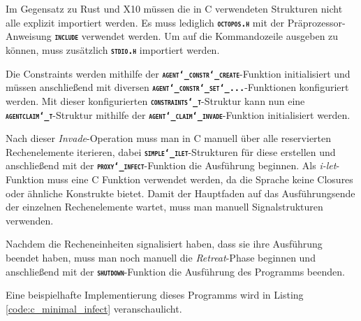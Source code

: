 Im Gegensatz zu Rust und X10 müssen die in C verwendeten Strukturen nicht alle explizit importiert werden.
Es muss lediglich \texttt{\textsc{\textbf{octopos.h}}} mit der Präprozessor-Anweisung
\texttt{\textsc{\textbf{include}}} verwendet werden.
Um auf die Kommandozeile ausgeben zu können, muss zusätzlich \texttt{\textsc{\textbf{stdio.h}}} importiert werden.

Die Constraints werden mithilfe der \texttt{\textsc{\textbf{agent\char`_constr\char`_create}}}-Funktion initialisiert
und müssen anschließend mit diversen \texttt{\textsc{\textbf{agent\char`_constr\char`_set\char`_...}}}-Funktionen
konfiguriert werden.
Mit dieser konfigurierten \texttt{\textsc{\textbf{constraints\char`_t}}}-Struktur kann nun eine
\texttt{\textsc{\textbf{agentclaim\char`_t}}}-Struktur mithilfe
der \texttt{\textsc{\textbf{agent\char`_claim\char`_invade}}}-Funktion initialisiert werden.

Nach dieser \textit{Invade}-Operation muss man in C manuell über alle reservierten Rechenelemente iterieren, dabei
\texttt{\textsc{\textbf{simple\char`_ilet}}}-Strukturen für diese erstellen und anschließend mit der
\texttt{\textsc{\textbf{proxy\char`_infect}}}-Funktion
die Ausführung beginnen. Als \textit{i-let}-Funktion muss eine C Funktion verwendet werden,
da die Sprache keine Closures oder ähnliche Konstrukte bietet.
Damit der Hauptfaden auf das Ausführungsende der einzelnen Rechenelemente wartet, muss
man manuell Signalstrukturen verwenden.

Nachdem die Recheneinheiten signalisiert haben, dass sie ihre Ausführung beendet haben, muss man noch manuell
die \textit{Retreat}-Phase beginnen und anschließend mit der \texttt{\textsc{\textbf{shutdown}}}-Funktion
die Ausführung des Programms beenden.

Eine beispielhafte Implementierung dieses Programms wird in Listing \ref{code:c_minimal_infect} veranschaulicht.

